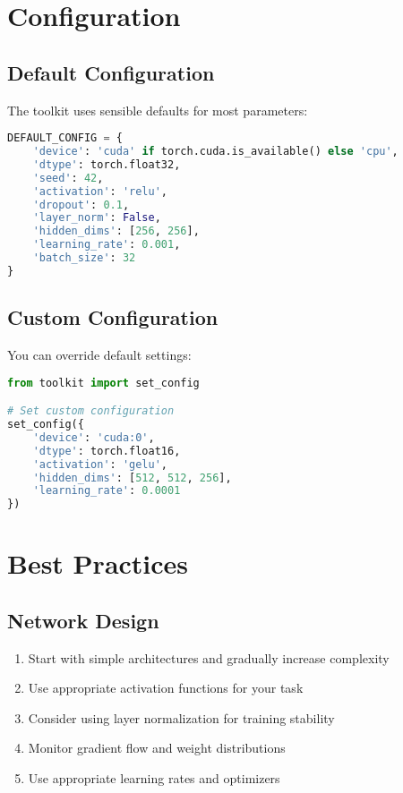 \section{Configuration}

\subsection{Default Configuration}

The toolkit uses sensible defaults for most parameters:

\begin{lstlisting}[language=python, caption=Default configuration]
DEFAULT_CONFIG = {
    'device': 'cuda' if torch.cuda.is_available() else 'cpu',
    'dtype': torch.float32,
    'seed': 42,
    'activation': 'relu',
    'dropout': 0.1,
    'layer_norm': False,
    'hidden_dims': [256, 256],
    'learning_rate': 0.001,
    'batch_size': 32
}
\end{lstlisting}

\subsection{Custom Configuration}

You can override default settings:

\begin{lstlisting}[language=python, caption=Custom configuration]
from toolkit import set_config

# Set custom configuration
set_config({
    'device': 'cuda:0',
    'dtype': torch.float16,
    'activation': 'gelu',
    'hidden_dims': [512, 512, 256],
    'learning_rate': 0.0001
})
\end{lstlisting}

\section{Best Practices}

\subsection{Network Design}

\begin{enumerate}
    \item Start with simple architectures and gradually increase complexity
    \item Use appropriate activation functions for your task
    \item Consider using layer normalization for training stability
    \item Monitor gradient flow and weight distributions
    \item Use appropriate learning rates and optimizers
\end{enumerate}

